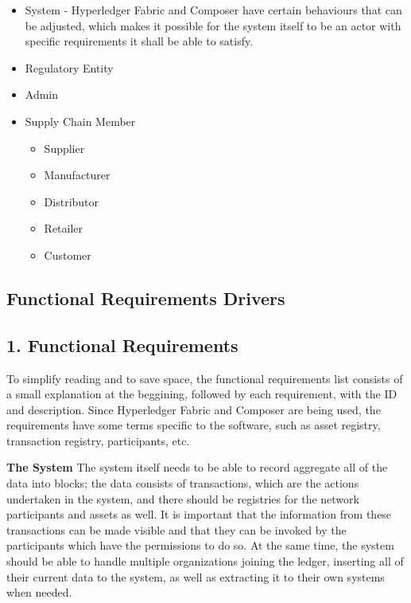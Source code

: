 		\begin{itemize}
			\item System - Hyperledger Fabric and Composer have certain behaviours that can be adjusted, which makes it possible for the system itself to be an actor with specific requirements it shall be able to satisfy.
			\item Regulatory Entity
			\item Admin
			\item Supply Chain Member
			\begin{itemize}
				\item Supplier  %
				\item  Manufacturer
				\item Distributor
				\item Retailer
				\item Customer
		\end{itemize}
	\end{itemize}
\subsection{Functional Requirements Drivers}
	
\subsection*{1. Functional  Requirements}

To simplify reading and to save space, the functional requirements list consists of a small explanation at the beggining, followed by each requirement, with the ID and description. Since Hyperledger Fabric and Composer are being used, the requirements have some terms specific to the software, such as asset registry, transaction registry, participants, etc.

		\par \textbf{The System}
		 The system itself needs to be able to record aggregate all of the data into blocks; the data consists of transactions, which are the actions undertaken in the system, and there should be registries for the network participants and assets as well. It is important that the information from these transactions can be made visible and that they can be invoked by the participants which have the permissions to do so. At the same time, the system should be able to handle multiple organizations joining the ledger, inserting all of their current data to the system, as well as extracting it to their own systems when needed. 
		

